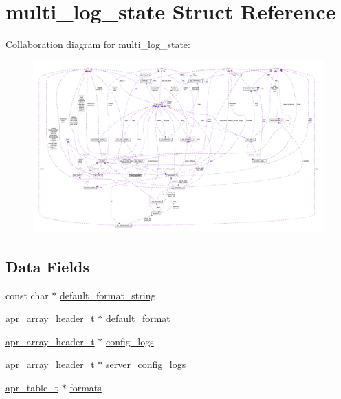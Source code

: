 \hypertarget{structmulti__log__state}{}\section{multi\+\_\+log\+\_\+state Struct Reference}
\label{structmulti__log__state}


Collaboration diagram for multi\+\_\+log\+\_\+state\+:
\nopagebreak
\begin{figure}[H]
\begin{center}
\leavevmode
\includegraphics[width=350pt]{structmulti__log__state__coll__graph}
\end{center}
\end{figure}
\subsection*{Data Fields}
\begin{DoxyCompactItemize}
\item 
const char $\ast$ \hyperlink{structmulti__log__state_a38be0dea4646fafc30c42b89e24b57cb}{default\+\_\+format\+\_\+string}
\item 
\hyperlink{structapr__array__header__t}{apr\+\_\+array\+\_\+header\+\_\+t} $\ast$ \hyperlink{structmulti__log__state_a5636e3af9675ba310c3b7fa54592f447}{default\+\_\+format}
\item 
\hyperlink{structapr__array__header__t}{apr\+\_\+array\+\_\+header\+\_\+t} $\ast$ \hyperlink{structmulti__log__state_abfec99f5d8f6cd82cd015ce7979d11d9}{config\+\_\+logs}
\item 
\hyperlink{structapr__array__header__t}{apr\+\_\+array\+\_\+header\+\_\+t} $\ast$ \hyperlink{structmulti__log__state_a2e7f7a723b5c1cea041979bd8e83a727}{server\+\_\+config\+\_\+logs}
\item 
\hyperlink{structapr__table__t}{apr\+\_\+table\+\_\+t} $\ast$ \hyperlink{structmulti__log__state_a49d211f89a7ec8726134fc15f447ee46}{formats}
\end{DoxyCompactItemize}


